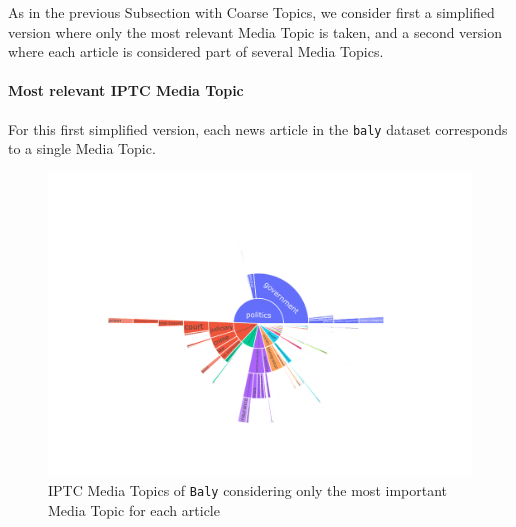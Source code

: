






As in the previous Subsection with Coarse Topics, we consider first a simplified version where only the most relevant Media Topic is taken, and a second version where each article is considered part of several Media Topics.


\paragraph{Most relevant IPTC Media Topic}

For this first simplified version, each news article in the \texttt{baly} dataset corresponds to a single Media Topic.

\begin{figure}[!htbp]
    \centering
    \includegraphics[trim={2.2cm 2cm 2.2cm 2cm},clip,width=\linewidth]{figures/baly_iptc_only_first.pdf}
    \caption{IPTC Media Topics of \texttt{Baly} considering only the most important Media Topic for each article}
    \label{fig:baly_iptc_only_first}
\end{figure}

